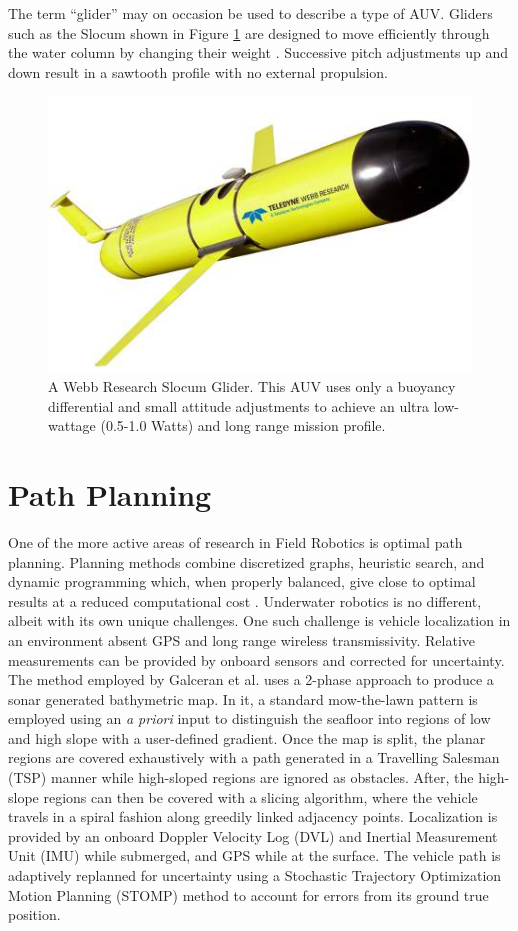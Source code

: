 \documentclass[double,12pt]{beavtex}
\begin{document}
The term ``glider'' may on occasion be used to describe a type of AUV. Gliders such as the Slocum shown in Figure \ref{fig:slocum} are designed to move efficiently through the water column by changing their weight \cite{bachmayer}. Successive pitch adjustments up and down result in a sawtooth profile with no external propulsion.

\begin{figure}[h!]
\begin{center}
\includegraphics[width=0.5\columnwidth]{slocum}
\caption{A Webb Research Slocum Glider. This AUV uses only a buoyancy differential and small attitude adjustments to achieve an ultra low-wattage (0.5-1.0 Watts) and long range mission profile.}
\label{fig:slocum}
\end{center}
\end{figure}

\section{Path Planning}
One of the more active areas of research in Field Robotics is optimal path planning. Planning methods combine discretized graphs, heuristic search, and dynamic programming which, when properly balanced, give close to optimal results at a reduced computational cost \cite{lavalle}. Underwater robotics is no different, albeit with its own unique challenges. One such challenge is vehicle localization in an environment absent GPS and long range wireless transmissivity. Relative measurements can be provided by onboard sensors and corrected for uncertainty. The method employed by Galceran et al. \cite{galceran} uses a 2-phase approach to produce a sonar generated bathymetric map. In it, a standard mow-the-lawn pattern is employed using an \textit{a priori} input to distinguish the seafloor into regions of low and high slope with a user-defined gradient. Once the map is split, the planar regions are covered exhaustively with a path generated in a Travelling Salesman (TSP) manner while high-sloped regions are ignored as obstacles. After, the high-slope regions can then be covered with a slicing algorithm, where the vehicle travels in a spiral fashion along greedily linked adjacency points. Localization is provided by an onboard Doppler Velocity Log (DVL) and Inertial Measurement Unit (IMU) while submerged, and GPS while at the surface. The vehicle path is adaptively replanned for uncertainty using a Stochastic Trajectory Optimization Motion Planning (STOMP) method to account for errors from its ground true position.
\end{document}
